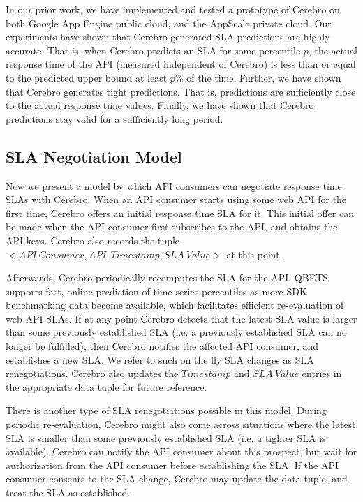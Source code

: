 In our prior work, we have implemented and tested a prototype of Cerebro on both Google 
App Engine public cloud, and the AppScale private cloud.
Our experiments have shown that Cerebro-generated SLA predictions are highly accurate. That is, when 
Cerebro predicts an SLA for some percentile $p$, the actual response time of the API (measured
independent of Cerebro) is less
than or equal to the predicted upper bound at least $p\%$ of the time. Further, we have shown that Cerebro
generates tight predictions. That is, predictions are sufficiently close to the actual response time
values. Finally, we have shown that Cerebro predictions stay valid for a sufficiently long period.  

\vspace{-0.1in}
\subsection{ SLA Negotiation Model}
\vspace{-0.1in}
Now we present a model by which API consumers can negotiate response time SLAs with Cerebro.
When an API consumer starts using some web API for the first time, Cerebro offers an initial response
time SLA for it. This initial offer can be made when the API consumer first subscribes to the API, and 
obtains the API keys. Cerebro also records the tuple $<API\ Consumer, API, Timestamp, SLA\ Value>$
at this point. 

Afterwards, Cerebro periodically recomputes the SLA for the API. QBETS supports fast,
online prediction of time series percentiles as more SDK benchmarking data become available, which
facilitates efficient re-evaluation of web API SLAs. If at any point Cerebro detects that the latest SLA value
is larger than some previously established SLA (i.e. a previously established SLA can no longer be
fulfilled), then Cerebro notifies the affected API consumer, and establishes a new SLA. We refer to such on the fly
SLA changes as SLA renegotiations. Cerebro also updates the $Timestamp$ and $SLA\ Value$
entries in the appropriate data tuple for future reference.

There is another type of SLA renegotiations possible in this model.
During periodic re-evaluation, Cerebro might also come across situations where the latest SLA is smaller
than some previously established SLA (i.e. a tighter SLA is available). Cerebro can notify the 
API consumer about this prospect, but wait for authorization from the API consumer before 
establishing the SLA. If the API consumer consents to the SLA change, Cerebro may update the
data tuple, and treat the SLA as established.

